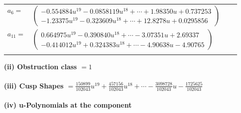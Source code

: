 \documentclass[1p]{elsarticle_modified}
\theoremstyle{definition}
\begin{document}
\begin{tabular}{m{7pt} m{180pt} m{7pt} m{180pt} }
\flushright $a_{6}=$&$\begin{pmatrix}-0.554884 u^{19}-0.0858119 u^{18}+\cdots+1.98350 u+0.737253\\-1.23375 u^{19}-0.323609 u^{18}+\cdots+12.8278 u+0.0295856\end{pmatrix}$ \\
\flushright $a_{11}=$&$\begin{pmatrix}0.664975 u^{19}-0.390840 u^{18}+\cdots-3.07351 u+2.69337\\-0.414012 u^{19}+0.324383 u^{18}+\cdots-4.90638 u-4.90765\end{pmatrix}$\\&\end{tabular}
\flushleft \textbf{(ii) Obstruction class $= 1$}\\~\\
\flushleft \textbf{(iii) Cusp Shapes $= \frac{150899}{102043} u^{19}+\frac{457156}{102043} u^{18}+\cdots-\frac{3098728}{102043} u-\frac{1725625}{102043}$}\\~\\
\newpage\renewcommand{\arraystretch}{1}
\flushleft \textbf{(iv) u-Polynomials at the component}\newline \\
\end{document}
